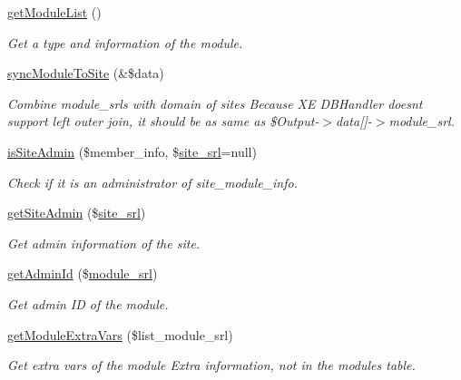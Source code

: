 \begin{DoxyCompactItemize}
\item 
\hyperlink{classmoduleModel_af51708f2ce0243f482bc92a453dd27c4}{get\+Module\+List} ()
\begin{DoxyCompactList}\small\item\em Get a type and information of the module. \end{DoxyCompactList}\item 
\hyperlink{classmoduleModel_ab51d556817682d653b92e09a34b138d6}{sync\+Module\+To\+Site} (\&\$data)
\begin{DoxyCompactList}\small\item\em Combine module\+\_\+srls with domain of sites Because XE D\+B\+Handler doesn\textquotesingle{}t support left outer join, it should be as same as \$\+Output-\/$>$data\mbox{[}\mbox{]}-\/$>$module\+\_\+srl. \end{DoxyCompactList}\item 
\hyperlink{classmoduleModel_aae55c42d2818ffd09f81d6cb215c59ff}{is\+Site\+Admin} (\$member\+\_\+info, \$\hyperlink{ko_8install_8php_a8b1406b4ad1048041558dce6bfe89004}{site\+\_\+srl}=null)
\begin{DoxyCompactList}\small\item\em Check if it is an administrator of site\+\_\+module\+\_\+info. \end{DoxyCompactList}\item 
\hyperlink{classmoduleModel_a6baa2faf83fc96fba51072276c9cb7c3}{get\+Site\+Admin} (\$\hyperlink{ko_8install_8php_a8b1406b4ad1048041558dce6bfe89004}{site\+\_\+srl})
\begin{DoxyCompactList}\small\item\em Get admin information of the site. \end{DoxyCompactList}\item 
\hyperlink{classmoduleModel_a302d180d2acef6331f9123d60f76c8c1}{get\+Admin\+Id} (\$\hyperlink{ko_8install_8php_a370bb6450fab1da3e0ed9f484a38b761}{module\+\_\+srl})
\begin{DoxyCompactList}\small\item\em Get admin ID of the module. \end{DoxyCompactList}\item 
\hyperlink{classmoduleModel_a4e93226573048a7b9c8e2cb842d0cb30}{get\+Module\+Extra\+Vars} (\$list\+\_\+module\+\_\+srl)
\begin{DoxyCompactList}\small\item\em Get extra vars of the module Extra information, not in the modules table. \end{DoxyCompactList}\item 

\end{DoxyCompactItemize}
